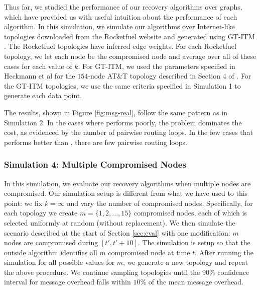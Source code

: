 Thus far, we studied the performance of our recovery algorithms over \er graphs, which have provided us with useful intuition about the performance
of each algorithm. In this simulation, we simulate our algorithms over Internet-like topologies downloaded from the Rocketfuel website \cite{Rocketfuel} and generated using GT-ITM 
\cite{GT-ITM}.  The Rocketfuel topologies have inferred edge weights. For each Rocketfuel topology, we let each node be
the compromised node and average over all of these cases for each value of $k$.  For GT-ITM, we used the parameters specified in Heckmann et al \cite{Heckmann} for  the $154$-node AT\&T topology
described in Section 4 of \cite{Heckmann}. For the GT-ITM topologies, we use the same criteria specified in Simulation 1 to generate each data point. 

The results, shown in Figure \ref{fig:msg-real}, follow the same pattern as in Simulation 2.  
In the cases where \second performs poorly,
the \infinity problem dominates the cost, as evidenced by the number of pairwise routing loops. In the few cases that \second performs better than \purges, there 
are few pairwise routing loops.

\subsubsection{Simulation 4:  Multiple Compromised Nodes}
\label{subsubsec:many}

In this simulation, we evaluate our recovery algorithms when multiple nodes are compromised. Our simulation setup is different from what we have used to this point:
we fix $k=\infty$ and vary the number of compromised nodes. Specifically, for each topology we create $m = \{1,2, ... , 15\}$ compromised nodes, each of which is selected  
uniformly at random (without replacement).  We then simulate the scenario described at the start of Section \ref{sec:eval} with one modification: $m$ nodes are 
compromised during $[t',t'+ 10]$. %
The simulation is setup so that the outside algorithm identifies all $m$ compromised node at time $t$. %
After running the simulation for all possible values for $m$, we generate a new topology and repeat the above procedure. 
We continue sampling topologies until the $90\%$ confidence interval for message overhead falls within $10\%$ of the mean message overhead. 

